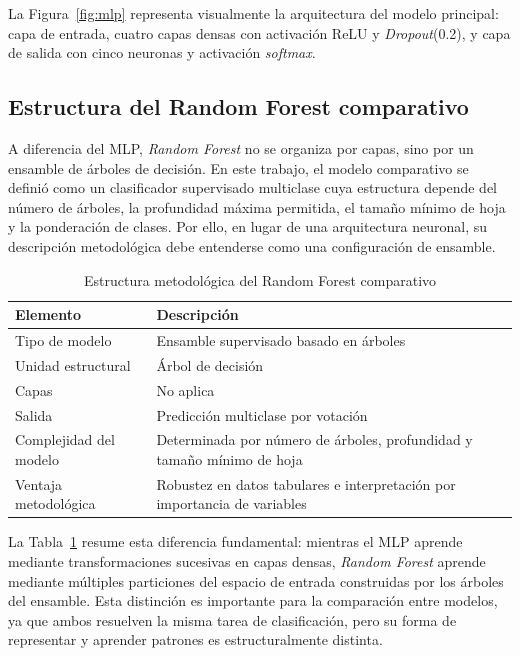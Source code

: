 \documentclass[conference]{IEEEtran}
\begin{document}
La Figura~\ref{fig:mlp} representa visualmente la arquitectura del modelo principal: capa de entrada, cuatro capas densas con activación ReLU y \textit{Dropout}(0.2), y capa de salida con cinco neuronas y activación \textit{softmax}.

\subsection{Estructura del Random Forest comparativo}

A diferencia del MLP, \textit{Random Forest} no se organiza por capas, sino por un ensamble de árboles de decisión. En este trabajo, el modelo comparativo se definió como un clasificador supervisado multiclase cuya estructura depende del número de árboles, la profundidad máxima permitida, el tamaño mínimo de hoja y la ponderación de clases. Por ello, en lugar de una arquitectura neuronal, su descripción metodológica debe entenderse como una configuración de ensamble.

\begin{table}[htbp]
\centering
\caption{Estructura metodológica del Random Forest comparativo}
\scriptsize
\setlength{\tabcolsep}{4pt}
\begin{tabular}{p{2.8cm}p{4.4cm}}
\toprule
Elemento & Descripción \\
\midrule
Tipo de modelo & Ensamble supervisado basado en árboles \\
Unidad estructural & Árbol de decisión \\
Capas & No aplica \\
Salida & Predicción multiclase por votación \\
Complejidad del modelo & Determinada por número de árboles, profundidad y tamaño mínimo de hoja \\
Ventaja metodológica & Robustez en datos tabulares e interpretación por importancia de variables \\
\bottomrule
\end{tabular}
\normalsize
\label{tab:rf_estructura}
\end{table}

La Tabla~\ref{tab:rf_estructura} resume esta diferencia fundamental: mientras el MLP aprende mediante transformaciones sucesivas en capas densas, \textit{Random Forest} aprende mediante múltiples particiones del espacio de entrada construidas por los árboles del ensamble. Esta distinción es importante para la comparación entre modelos, ya que ambos resuelven la misma tarea de clasificación, pero su forma de representar y aprender patrones es estructuralmente distinta.
\end{document}
